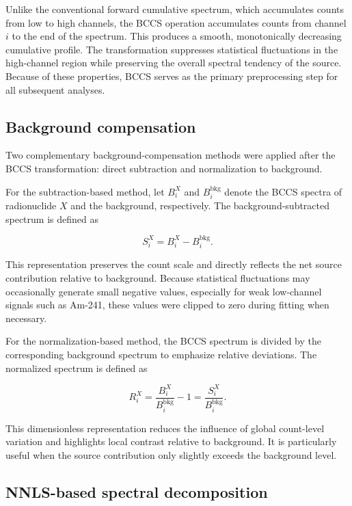 \documentclass[pdflatex,sn-mathphys-num, table]{sn-jnl}%
\theoremstyle{thmstyleone}%
\theoremstyle{thmstyletwo}%
\theoremstyle{thmstylethree}%
\begin{document}
Unlike the conventional forward cumulative spectrum, which accumulates counts from low to high channels, the BCCS operation accumulates counts from channel $i$ to the end of the spectrum. This produces a smooth, monotonically decreasing cumulative profile. The transformation suppresses statistical fluctuations in the high-channel region while preserving the overall spectral tendency of the source. Because of these properties, BCCS serves as the primary preprocessing step for all subsequent analyses.


\subsection*{Background compensation}

Two complementary background-compensation methods were applied after the BCCS transformation: direct subtraction and normalization to background.

For the subtraction-based method, let $B^X_i$ and $B^\text{bkg}_i$ denote the BCCS spectra of radionuclide $X$ and the background, respectively. The background-subtracted spectrum is defined as

\begin{equation}
S^X_i = B^X_i - B^\text{bkg}_i.
\end{equation}

This representation preserves the count scale and directly reflects the net source contribution relative to background. Because statistical fluctuations may occasionally generate small negative values, especially for weak low-channel signals such as Am-241, these values were clipped to zero during fitting when necessary. 

For the normalization-based method, the BCCS spectrum is divided by the corresponding background spectrum to emphasize relative deviations. The normalized spectrum is defined as

\begin{equation}
R^X_i = \dfrac{B_i^X}{B_i^\text{bkg}} -1 = \dfrac{S_i^X}{B_i^\text{bkg}}.
\end{equation}

This dimensionless representation reduces the influence of global count-level variation and highlights local contrast relative to background. It is particularly useful when the source contribution only slightly exceeds the background level.

\subsection*{NNLS-based spectral decomposition}
\end{document}

